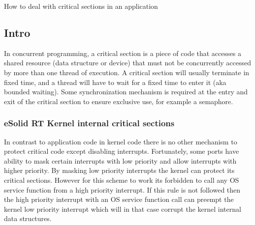 How to deal with critical sections in an application

\par
\par
\par
\hypertarget{critical_section_cs_intro}{}\subsection{Intro}\label{critical_section_cs_intro}
In concurrent programming, a critical section is a piece of code that accesses a shared resource (data structure or device) that must not be concurrently accessed by more than one thread of execution. A critical section will usually terminate in fixed time, and a thread will have to wait for a fixed time to enter it (aka bounded waiting). Some synchronization mechanism is required at the entry and exit of the critical section to ensure exclusive use, for example a semaphore.\hypertarget{critical_section_kern_critical_sections}{}\subsubsection{e\-Solid R\-T Kernel internal critical sections}\label{critical_section_kern_critical_sections}
In contrast to application code in kernel code there is no other mechanism to protect critical code except disabling interrupts. Fortunately, some ports have ability to mask certain interrupts with low priority and allow interrupts with higher priority. By masking low priority interrupts the kernel can protect its critical sections. However for this scheme to work its forbidden to call any O\-S service function from a high priority interrupt. If this rule is not followed then the high priority interrupt with an O\-S service function call can preempt the kernel low priority interrupt which will in that case corrupt the kernel internal data structures.

